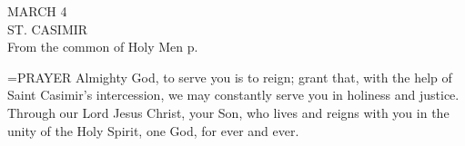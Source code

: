 \begin{center}\normalsize MARCH 4\\
\footnotesize ST. CASIMIR\\
\footnotesize From the common of Holy Men p. \\
\end{center}

\hangindent=\parindent \small{PRAYER 
Almighty God, to serve you is to reign;
grant that, with the help of Saint Casimir's intercession,
we may constantly serve you in holiness and justice.
Through our Lord Jesus Christ, your Son,
who lives and reigns with you in the unity of the Holy Spirit,
one God, for ever and ever.\\}
 

